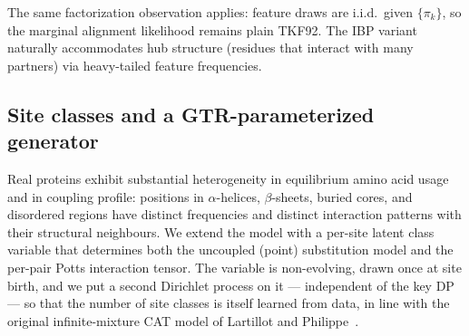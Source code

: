 The same factorization observation applies: feature draws are i.i.d.\
given $\{\pi_k\}$, so the marginal alignment likelihood remains
plain TKF92. The IBP variant naturally accommodates hub structure
(residues that interact with many partners) via heavy-tailed feature
frequencies.

\subsection{Site classes and a GTR-parameterized generator}
\label{sec:gtr-potts}

Real proteins exhibit substantial heterogeneity in equilibrium amino
acid usage and in coupling profile: positions in $\alpha$-helices,
$\beta$-sheets, buried cores, and disordered regions have distinct
frequencies and distinct interaction patterns with their structural
neighbours. We extend the model with a per-site latent class
variable that determines both the uncoupled (point) substitution
model and the per-pair Potts interaction tensor. The variable is
non-evolving, drawn once at site birth, and we put a second
Dirichlet process on it --- independent of the key DP --- so that
the number of site classes is itself learned from data, in line
with the original infinite-mixture CAT model of Lartillot and
Philippe~\citep{lartillotcat}.

